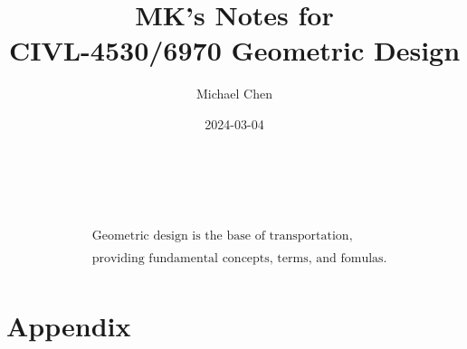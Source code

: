 \documentclass[11pt]{article}
\title{MK's Notes for \\ CIVL-4530/6970 Geometric Design}
\date{2024-03-04}
\author{Michael Chen}
\begin{document}
  \maketitle

  \begin{align*}
  \\
  \\
  \\
  \\
  \\
  \\
  \\
  \\
  & \text{Geometric design is the base of transportation,}\\ 
  \\
  & \text{providing fundamental concepts, terms, and fomulas.}\\
  \end{align*}
  \newpage

  \tableofcontents
  \newpage


  
  \newpage
  
  \newpage
  
  \newpage
  
  \newpage

  
  \newpage

  \section{Appendix}
\end{document}
